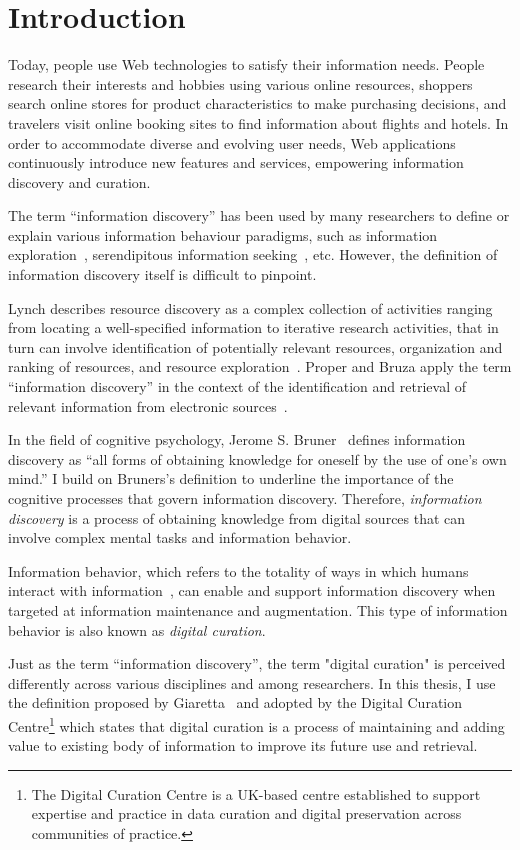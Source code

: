 \chapter{Introduction}
\label{chapter:chapter_intro}

Today, people use Web technologies to satisfy their information needs. People research their interests and hobbies using various online resources, shoppers search online stores for product characteristics to make purchasing decisions, and travelers visit online booking sites to find information about flights and hotels. In order to accommodate diverse and evolving user needs, Web applications continuously introduce new features and services, empowering information discovery and curation. 


The term ``information discovery'' has been used by many researchers to define or explain various information behaviour paradigms, such as information exploration~\cite{waterworth1991model}, serendipitous information seeking~\cite{foster2003serendipity}, etc. However, the definition of information discovery itself is difficult to pinpoint. 

Lynch describes resource discovery as a complex collection of activities ranging from locating a well-specified information to iterative research activities, that in turn can involve identification
of potentially relevant resources, organization and ranking of resources, and resource exploration~\cite{lynch1995networked}. Proper and Bruza apply the term ``information discovery'' in the context of  the identification and retrieval of relevant information from electronic sources~\cite{proper1999information}. 

In the field of cognitive psychology, Jerome S. Bruner~\cite{bruner1961act} defines information discovery as ``all forms of obtaining knowledge for oneself by the use of one's own mind.'' I build on Bruners's definition to underline the importance of the cognitive processes that govern information discovery. Therefore, \textit{information discovery} is a process of obtaining knowledge from digital sources that can involve complex mental tasks and information behavior.  

Information behavior, which refers to the totality of ways in which humans interact with information~\cite{wilson2000human}, can enable and support information discovery when targeted at information maintenance and augmentation. This type of information behavior is also known as \textit{digital curation}.

Just as the term ``information discovery'', the term "digital curation" is perceived differently across various disciplines and among researchers. In this thesis, I use the definition proposed by Giaretta~\cite{giaretta2006dcc} and adopted by the Digital Curation Centre\footnote{The Digital Curation Centre is a UK-based centre established to support expertise and practice in data curation and digital preservation across communities of practice.} which states that digital curation is a process of maintaining and adding value to existing body of information to improve its future use and retrieval.   


